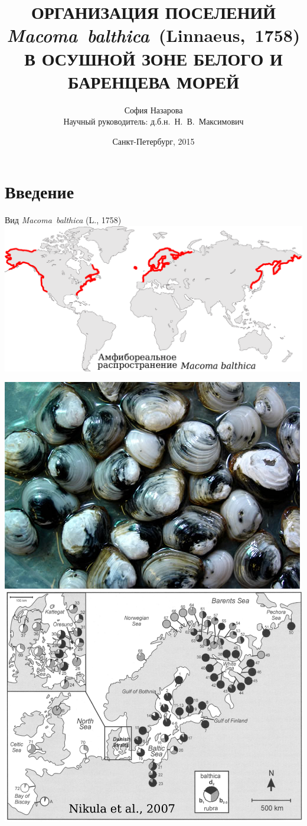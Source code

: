 \documentclass{beamer}
\begin{document}
\title[]{ОРГАНИЗАЦИЯ ПОСЕЛЕНИЙ\\ {\it Macoma~balthica}~(Linnaeus,~1758)\\ В ОСУШНОЙ ЗОНЕ БЕЛОГО И БАРЕНЦЕВА МОРЕЙ}
\author[]{София Назарова \\ \medskip
	\footnotesize{Научный руководитель: д.б.н.~Н.~В.~Максимович}}
\date{Санкт-Петербург, 2015} 

\frame{\titlepage} 







		\section{Введение}
\begin{frame}{Вид {\it Macoma~balthica} (L., 1758)}
			\includegraphics[width=.9\textwidth]{areal_line.pdf}

			\includegraphics[width=.49\textwidth]{Baltic_macoma.jpg}	\includegraphics[width=.49\textwidth]{Macoma_genetic.pdf}
\end{frame}
\end{document}
